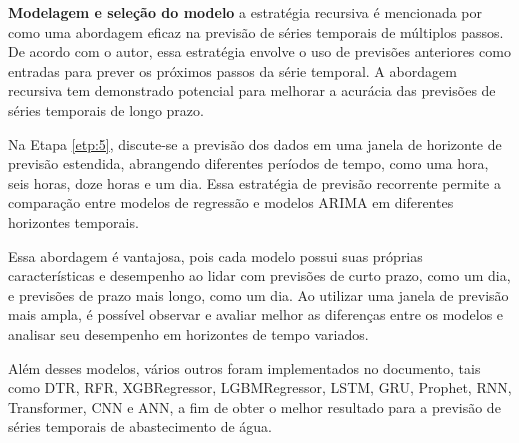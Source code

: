 \textbf{Modelagem e sele\c c\~ao do modelo}
a estratégia recursiva é mencionada por  como uma abordagem eficaz na previsão de séries temporais de múltiplos passos. De acordo com o autor, essa estratégia envolve o uso de previsões anteriores como entradas para prever os próximos passos da série temporal. A abordagem recursiva tem demonstrado potencial para melhorar a acurácia das previsões de séries temporais de longo prazo.

Na Etapa \ref{etp:5}, discute-se a previsão dos dados em uma janela de horizonte de previsão estendida, abrangendo diferentes períodos de tempo, como uma hora, seis horas, doze horas e um dia. Essa estratégia de previsão recorrente permite a comparação entre modelos de regressão e modelos ARIMA em diferentes horizontes temporais.

Essa abordagem é vantajosa, pois cada modelo possui suas próprias características e desempenho ao lidar com previsões de curto prazo, como um dia, e previsões de prazo mais longo, como um dia. Ao utilizar uma janela de previsão mais ampla, é possível observar e avaliar melhor as diferenças entre os modelos e analisar seu desempenho em horizontes de tempo variados.

Além desses modelos, vários outros foram implementados no documento, tais como DTR, RFR, XGBRegressor, LGBMRegressor, LSTM, GRU, Prophet, RNN, Transformer, CNN e ANN, a fim de obter o melhor resultado para a previsão de séries temporais de abastecimento de água.